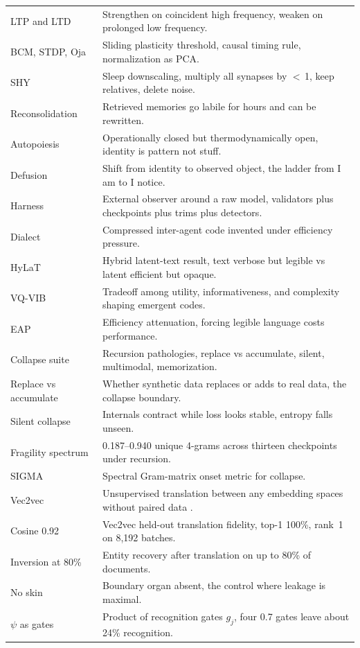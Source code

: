\begin{center}
\begin{tabular}{p{3.6cm}p{8.8cm}}
LTP and LTD & Strengthen on coincident high frequency, weaken on prolonged low frequency. \\
BCM, STDP, Oja & Sliding plasticity threshold, causal timing rule, normalization as PCA. \\
SHY & Sleep downscaling, multiply all synapses by $<$\,1, keep relatives, delete noise. \\
Reconsolidation & Retrieved memories go labile for hours and can be rewritten. \\
Autopoiesis & Operationally closed but thermodynamically open, identity is pattern not stuff. \\
Defusion & Shift from identity to observed object, the ladder from I am to I notice. \\
Harness & External observer around a raw model, validators plus checkpoints plus trims plus detectors. \\
Dialect & Compressed inter-agent code invented under efficiency pressure. \\
HyLaT & Hybrid latent-text result, text verbose but legible vs latent efficient but opaque. \\
VQ-VIB & Tradeoff among utility, informativeness, and complexity shaping emergent codes. \\
EAP & Efficiency attenuation, forcing legible language costs performance. \\
Collapse suite & Recursion pathologies, replace vs accumulate, silent, multimodal, memorization. \\
Replace vs accumulate & Whether synthetic data replaces or adds to real data, the collapse boundary. \\
Silent collapse & Internals contract while loss looks stable, entropy falls unseen. \\
Fragility spectrum & 0.187--0.940 unique 4-grams across thirteen checkpoints under recursion. \\
SIGMA & Spectral Gram-matrix onset metric for collapse. \\
Vec2vec & Unsupervised translation between any embedding spaces without paired data \cite{jha2025}. \\
Cosine 0.92 & Vec2vec held-out translation fidelity, top-1 100\%, rank~1 on 8,192 batches. \\
Inversion at 80\% & Entity recovery after translation on up to 80\% of documents. \\
No skin & Boundary organ absent, the control where leakage is maximal. \\
$\psi$ as gates & Product of recognition gates $g_j$, four 0.7 gates leave about 24\% recognition. \\

\end{tabular}
\end{center}
